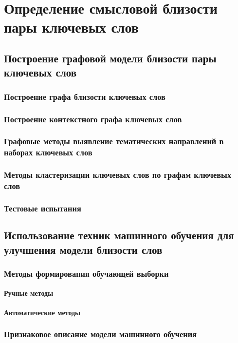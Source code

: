\chapter{Определение смысловой близости пары ключевых слов} \label{chapt1}

\section{Построение графовой модели близости пары ключевых слов}
\subsection{Построение графа близости ключевых слов} %
\subsection{Построение контекстного графа ключевых слов} %
\subsection{Графовые методы выявление тематических направлений в наборах ключевых слов} %
\subsection{Методы кластеризации ключевых слов по графам ключевых слов}
\subsection{Тестовые испытания}
\section{Использование техник машинного обучения для улучшения модели близости слов}
\subsection{Методы формирования обучающей выборки}
\subsubsection{Ручные методы}
\subsubsection{Автоматические методы}
\subsection{Признаковое описание модели машинного обучения}
